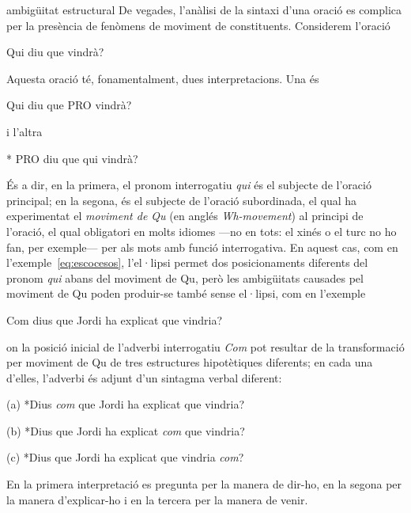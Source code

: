 \begin{enumerate}
\begin{persabermes}{ambigüitat estructural}
De vegades, l'anàlisi de la sintaxi d'una oració es complica per la
  presència de fenòmens de moviment de constituents. Considerem
  l'oració
\begin{example}
Qui diu que vindrà?
\end{example}
Aquesta oració té, fonamentalment, dues interpretacions. Una és
\begin{example}
Qui diu que PRO vindrà?
\end{example}
i l'altra
\begin{example}
* PRO diu que qui vindrà?
\end{example}
És a dir, en la primera, el pronom interrogatiu \emph{qui} és el
subjecte de l'oració principal; en la segona, és el subjecte de
l'oració subordinada, el qual ha experimentat el \emph{moviment de Qu}
(en anglés \emph{Wh-movement}) al principi de l'oració, el qual
obligatori en molts idiomes ---no en tots: el xinés o el turc no ho
fan, per exemple--- per als mots amb funció interrogativa. En aquest
cas, com en l'exemple~\ref{eq:escocesos}, l'el·lipsi permet dos
posicionaments diferents del pronom \emph{qui} abans del moviment de
Qu, però les ambigüitats causades pel moviment de Qu poden produir-se
també sense el·lipsi, com en l'exemple
\begin{exemple}
Com dius que Jordi ha explicat que vindria?
\end{exemple}
on la posició inicial de l'adverbi interrogatiu \emph{Com} pot
resultar de la transformació per moviment de Qu de tres estructures
hipotètiques diferents; en cada una d'elles, l'adverbi és adjunt d'un
sintagma verbal diferent:
  \begin{exemple}
  \item[(a)] *Dius \emph{com} que Jordi ha explicat que vindria?
  \item[(b)] *Dius que Jordi ha explicat \emph{com} que vindria?
  \item[(c)] *Dius que Jordi ha explicat que vindria \emph{com}?
  \end{exemple}
  En la primera interpretació es pregunta per la manera de dir-ho, en
  la segona per la manera d'explicar-ho i en la tercera per la manera
  de venir.
  

\end{persabermes}
\end{enumerate}
